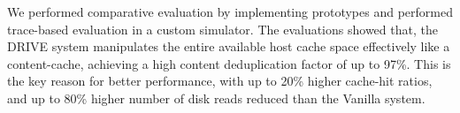 We performed comparative evaluation by implementing
prototypes and performed trace-based evaluation in a custom simulator.
The evaluations showed that,
the DRIVE system
manipulates the entire available host cache space effectively like
a content-cache, achieving a high content deduplication factor of up to 97\%.
This is the key reason for better performance, with
up to 20\% higher cache-hit ratios,
and up to 80\% higher number of disk reads reduced than the Vanilla system.
\\
\\

